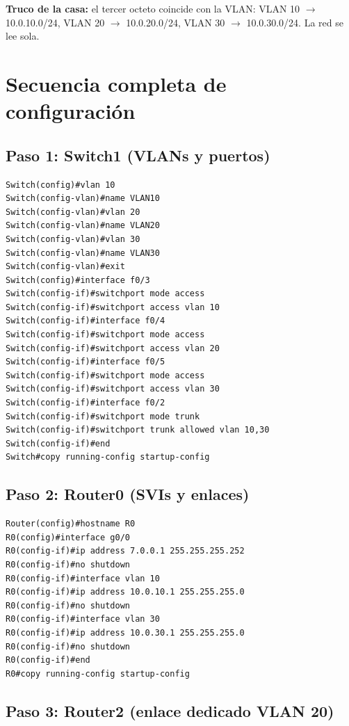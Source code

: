 \documentclass[11pt,a4paper]{report}
\begin{document}
\textbf{Truco de la casa:} el tercer octeto coincide con la VLAN: VLAN 10 $\rightarrow$ 10.0.10.0/24, VLAN 20 $\rightarrow$ 10.0.20.0/24, VLAN 30 $\rightarrow$ 10.0.30.0/24. La red se lee sola.

\section{Secuencia completa de configuración}

\subsection{Paso 1: Switch1 (VLANs y puertos)}

\begin{lstlisting}
Switch(config)#vlan 10
Switch(config-vlan)#name VLAN10
Switch(config-vlan)#vlan 20
Switch(config-vlan)#name VLAN20
Switch(config-vlan)#vlan 30
Switch(config-vlan)#name VLAN30
Switch(config-vlan)#exit
Switch(config)#interface f0/3
Switch(config-if)#switchport mode access
Switch(config-if)#switchport access vlan 10
Switch(config-if)#interface f0/4
Switch(config-if)#switchport mode access
Switch(config-if)#switchport access vlan 20
Switch(config-if)#interface f0/5
Switch(config-if)#switchport mode access
Switch(config-if)#switchport access vlan 30
Switch(config-if)#interface f0/2
Switch(config-if)#switchport mode trunk
Switch(config-if)#switchport trunk allowed vlan 10,30
Switch(config-if)#end
Switch#copy running-config startup-config
\end{lstlisting}

\subsection{Paso 2: Router0 (SVIs y enlaces)}

\begin{lstlisting}
Router(config)#hostname R0
R0(config)#interface g0/0
R0(config-if)#ip address 7.0.0.1 255.255.255.252
R0(config-if)#no shutdown
R0(config-if)#interface vlan 10
R0(config-if)#ip address 10.0.10.1 255.255.255.0
R0(config-if)#no shutdown
R0(config-if)#interface vlan 30
R0(config-if)#ip address 10.0.30.1 255.255.255.0
R0(config-if)#no shutdown
R0(config-if)#end
R0#copy running-config startup-config
\end{lstlisting}

\subsection{Paso 3: Router2 (enlace dedicado VLAN 20)}
\end{document}
